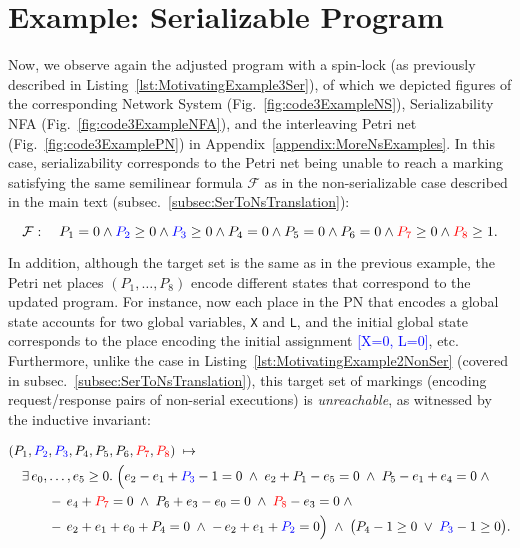 
\section{Example: Serializable Program}
\label{appendix:ns-serializable}


Now, we observe again the adjusted program with a spin-lock (as previously described in Listing~\ref{lst:MotivatingExample3Ser}), of which we depicted figures of the corresponding Network System (Fig.~\ref{fig:code3ExampleNS}), Serializability NFA (Fig.~\ref{fig:code3ExampleNFA}), and the interleaving Petri net (Fig.~\ref{fig:code3ExamplePN}) in Appendix~\ref{appendix:MoreNsExamples}.
%
In this case, serializability corresponds to the Petri net being unable to reach a marking satisfying the same semilinear formula \(\mathcal {F}\) as in the non-serializable case described in the main text (subsec.~\ref{subsec:SerToNsTranslation}):

\[
\mathcal {F}:
\quad
P_1 = 0 \wedge 
\textcolor{blue}{P_2} \ge 0 \wedge \textcolor{blue}{P_3} \ge 0  \wedge P_4 = 0
\wedge P_5 = 0 \wedge P_6 = 0 \wedge \textcolor{red}{P_7} \ge 0 \wedge \textcolor{red}{P_8} \ge 1.
\]

%


In addition, although the target set is the same as in the previous example, the Petri net places $(P_1,\ldots,P_8)$ encode different states that correspond to the updated program. For instance, now each place in the PN that encodes a global state accounts for two global variables, \texttt{X} and \texttt{L}, and the initial global state corresponds to the place encoding the initial assignment \textcolor{blue}{[X=0, L=0]}, etc.
%
Furthermore, unlike the case in Listing~\ref{lst:MotivatingExample2NonSer} (covered in subsec.~\ref{subsec:SerToNsTranslation}), this target set of markings (encoding request/response pairs of non-serial executions) is \textit{unreachable}, as witnessed by the inductive invariant:


\[
\begin{aligned}
	&(P_{1},\textcolor{blue}{P_{2}},\textcolor{blue}{P_{3}},P_{4},P_{5},P_{6},\textcolor{red}{P_{7}},\textcolor{red}{P_{8}})
	\;\mapsto\;\\
	&\quad
	\exists\,e_{0},\dots,e_{5}\ge0.\;
	\Bigl(
	e_{2}-e_{1}+\textcolor{blue}{P_{3}}-1=0\;\land\;
	e_{2}+P_{1}-e_{5}=0\;\land\;
	P_{5}-e_{1}+e_{4}=0\;\land\\
	&\qquad\quad
	-\,e_{4}+\textcolor{red}{P_{7}}=0\;\land\;
	P_{6}+e_{3}-e_{0}=0\;\land\;
	\textcolor{red}{P_{8}}-e_{3}=0\;\land\\
	&\qquad\quad
	-\,e_{2}+e_{1}+e_{0}+P_{4}=0\;\land\;
	-\,e_{2}+e_{1}+\textcolor{blue}{P_{2}}=0
	\Bigr)
	\;\land\;
	\bigl(P_{4}-1\ge0\;\lor\;\textcolor{blue}{P_{3}}-1\ge0\bigr).
\end{aligned}
\]


